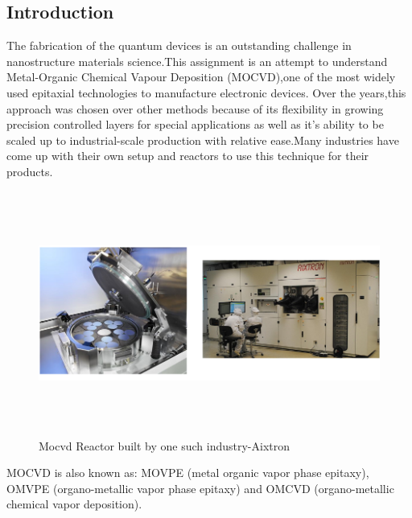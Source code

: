 \begin{flushleft}
\vspace{5mm}
\section{Introduction}
\vspace{2mm}
The fabrication of the quantum devices is an outstanding challenge in nanostructure materials science.This assignment is an attempt to understand Metal-Organic Chemical Vapour Deposition (MOCVD),one of the most widely used epitaxial technologies to manufacture electronic devices.
\vspace{3mm}
\newline
Over the years,this approach was chosen over other methods because of its flexibility in growing precision controlled layers for special applications as well as it's ability to be scaled up to industrial-scale production with relative ease.Many industries have come up with their own setup and reactors to use this technique for their products.
\vspace{5mm}
\newline
\begin{figure}[h!] 
	\centering
	\includegraphics[width=15cm, height=8cm]{images/axitron.png} 
	\caption{Mocvd Reactor built by one such industry-Aixtron}
	\label{fig:img1} 
\end{figure} 
\vspace{3mm}
\newline
MOCVD is also known as: MOVPE (metal organic vapor phase epitaxy), OMVPE (organo-metallic vapor phase epitaxy) and OMCVD (organo-metallic chemical vapor deposition).
\vspace{1mm}

\end{flushleft}
